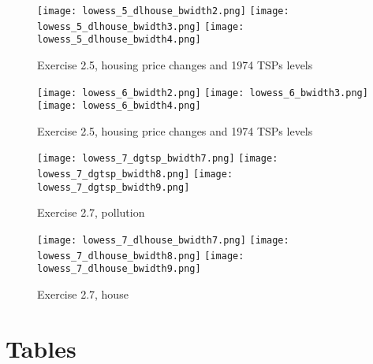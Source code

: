 \documentclass[12pt]{article}
\begin{document}
\clearpage

\begin{figure}[h!]
\centering
\caption{Exercise 2.5, housing price changes and 1974 TSPs levels}
\texttt{[image: lowess\_5\_dlhouse\_bwidth2.png]}
\texttt{[image: lowess\_5\_dlhouse\_bwidth3.png]}
\texttt{[image: lowess\_5\_dlhouse\_bwidth4.png]}
\label{fig_lowess5_house}
\end{figure}

\clearpage

\begin{figure}[h!]
\centering
\caption{Exercise 2.5, housing price changes and 1974 TSPs levels}
\texttt{[image: lowess\_6\_bwidth2.png]}
\texttt{[image: lowess\_6\_bwidth3.png]}
\texttt{[image: lowess\_6\_bwidth4.png]}
\label{fig_lowess6_house}
\end{figure}

\clearpage

\begin{figure}[h!]
\centering
\caption{Exercise 2.7, pollution}
\texttt{[image: lowess\_7\_dgtsp\_bwidth7.png]}
\texttt{[image: lowess\_7\_dgtsp\_bwidth8.png]}
\texttt{[image: lowess\_7\_dgtsp\_bwidth9.png]}
\label{lowess_7_dgtsp}
\end{figure}

\clearpage

\begin{figure}[h!]
\centering
\caption{Exercise 2.7, house}
\texttt{[image: lowess\_7\_dlhouse\_bwidth7.png]}
\texttt{[image: lowess\_7\_dlhouse\_bwidth8.png]}
\texttt{[image: lowess\_7\_dlhouse\_bwidth9.png]}
\label{lowess_7_dlhouse}
\end{figure}


\clearpage

\section*{Tables}



\clearpage



\clearpage



\clearpage



\clearpage



\clearpage


\end{document}
